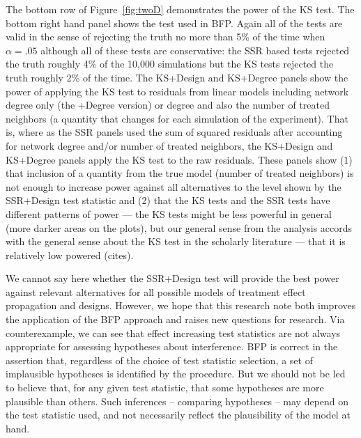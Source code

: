The bottom row of Figure~\ref{fig:twoD} demonstrates the power of the KS test.
The bottom right hand panel shows the test used in BFP. Again all of the tests
are valid in the sense of rejecting the truth no more than 5\% of the time
when $\alpha=.05$ although all of these tests are conservative: the SSR based
tests rejected the truth roughly 4\% of the 10,000 simulations but the KS
tests rejected the truth roughly 2\% of the time.  The KS+Design and
KS+Degree panels show the power of applying the KS test to residuals from linear
models including network degree only (the +Degree version) or degree and also
the number of treated neighbors (a quantity that changes for each simulation
of the experiment). That is, where as the SSR panels used the sum of squared
residuals after accounting for network degree and/or number of treated
neighbors, the KS+Design and KS+Degree panels apply the KS test to the raw
residuals. These panels show (1) that inclusion of a quantity from the true
model (number of treated neighbors) is not enough to increase power against
all alternatives to the level shown by the SSR+Design test statistic and (2)
that the KS tests and the SSR tests have different patterns of power --- the
KS tests might be less powerful in general (more darker areas on the plots),
but our general sense from the analysis accords with the general sense about
the KS test in the scholarly literature --- that it is relatively low powered
(cites).

We cannot say here whether the SSR+Design test will provide the best power
against relevant alternatives for all possible models of treatment effect
propagation and designs. However, we hope that this research note both
improves the application of the BFP approach and raises new questions for
research.  Via counterexample, we can see that effect
increasing test statistics are not always appropriate for assessing hypotheses
about interference. BFP is correct in the assertion that, regardless of the
choice of test statistic selection, a set of implausible hypotheses is
identified by the procedure. But we should not be led to believe that, for any
given test statistic, that some hypotheses are more plausible than others.
Such inferences -- comparing hypotheses -- may depend on the test statistic
used, and not necessarily reflect the plausibility of the model at hand.


